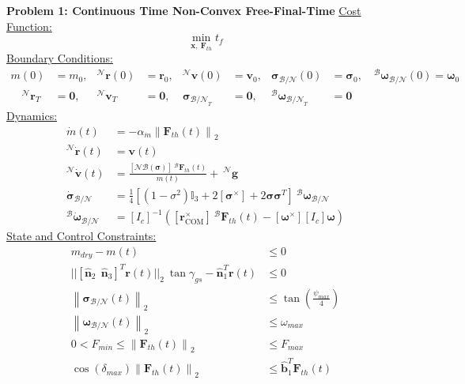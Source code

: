 \documentclass[conf]{new-aiaa}
\begin{document}
\begin{mdframed}
\label{ctproblem}
\textbf{Problem 1: Continuous Time Non-Convex Free-Final-Time}
\newline
\underline{Cost Function:}
\begin{equation*}
\min_{\mathbf{x}, \ \mathbf{F}_{th}} t_f
\end{equation*}
%
\underline{Boundary Conditions:}  
\begin{align*}
m(0) &= m_0, &^\mathcal{N}\mathbf{r}(0) &= \mathbf{r}_0, & ^\mathcal{N}\mathbf{v}(0) &= \mathbf{v}_0, & \boldsymbol{\sigma}_\mathcal{B/N}(0) &= \boldsymbol{\sigma}_0, \quad ^\mathcal{B}\boldsymbol{\omega}_\mathcal{B/N}(0) = \boldsymbol{\omega}_0 \\
\quad ^\mathcal{N}\mathbf{r}_{T} &= \mathbf{0}, & ^\mathcal{N}\mathbf{v}_T &= \mathbf{0}, & \boldsymbol{\sigma}_{\mathcal{B/N}_T} &= \mathbf{0}, & ^\mathcal{B}\boldsymbol{\omega}_{\mathcal{B/N}_{T}} &= \mathbf{0}
\end{align*}
%
\underline{Dynamics:}  
\begin{align*}
\dot{m}(t) &= -\alpha_{\dot{m}} \left\lVert \mathbf{F}_{th}(t) \right\rVert _2 \\
^\mathcal{N}\dot{\mathbf{r}}(t) &= \mathbf{v}(t) \\
^\mathcal{N}\dot{\mathbf{v}}(t) &= \frac{[\mathcal{NB}(\boldsymbol{\sigma})] \ ^\mathcal{B}\mathbf{F}_{th}(t)}{m(t)} +  \ ^\mathcal{N}\mathbf{g} \\
\dot{\boldsymbol{\sigma}}_\mathcal{B/N} &= \frac{1}{4} \left [(1-\sigma^2)\mathbb{I}_3 +  2[\boldsymbol{\sigma}^\times] + 2\boldsymbol{\sigma}\boldsymbol{\sigma}^T \right ] \ ^\mathcal{B}\boldsymbol{\omega}_\mathcal{B/N} \\
^\mathcal{B}\dot{\boldsymbol{\omega}}_\mathcal{B/N} &= [I_c]^{-1}\left([\boldsymbol{r}_{\text{COM}}^\times] \ ^\mathcal{B}\mathbf{F}_{th}(t) - [\boldsymbol{\omega}^\times][I_c]\boldsymbol{\omega}\right)
\end{align*}
%
\underline{State and Control Constraints:}  
\begin{align*}
m_{dry} - m(t) & \leq 0 \\
|| [\hat{\bm{n}}_2 \ \ \hat{\bm{n}}_3 ]^T \mathbf{r}(t) \lvert\lvert_2 \ \tan{\gamma_{gs}}  - \hat{\bm{n}}_1^T \mathbf{r}(t) & \leq 0 \\
%
\left \lVert \boldsymbol{\sigma}_\mathcal{B/N} (t) \right \lVert_2 &\leq \tan \left( \frac{\psi_{max}}{4} \right) \\
%
\left \lVert \bm{\omega}_\mathcal{B/N}(t) \right \lVert_2 & \leq \omega_{max}\\
0 < F_{min} \leq \left \lVert \bm{F}_{th}(t) \right \lVert_2 &\leq F_{max} \\
\cos(\delta_{max}) \left \lVert \bm{F}_{th}(t) \right \lVert_2 &\leq \hat{\bm{b}}_1^T \bm{F}_{th}(t)
\end{align*}
\end{mdframed}
\end{document}
